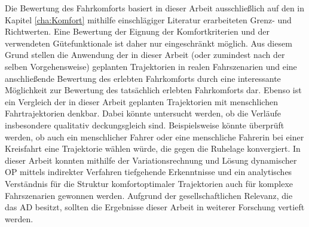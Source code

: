 Die Bewertung des Fahrkomforts basiert in dieser Arbeit ausschließlich auf den in Kapitel \ref{cha:Komfort} mithilfe einschlägiger Literatur erarbeiteten Grenz- und Richtwerten. Eine Bewertung der Eignung der Komfortkriterien und der verwendeten Gütefunktionale ist daher nur eingeschränkt möglich. Aus diesem Grund stellen die Anwendung der in dieser Arbeit (oder zumindest nach der selben Vorgehensweise) geplanten Trajektorien in realen Fahrszenarien und eine anschließende Bewertung des erlebten Fahrkomforts durch  eine interessante Möglichkeit zur Bewertung des tatsächlich erlebten Fahrkomforts dar. Ebenso ist ein Vergleich der in dieser Arbeit geplanten Trajektorien mit menschlichen Fahrtrajektorien denkbar. Dabei könnte untersucht werden, ob die Verläufe insbesondere qualitativ deckungsgleich sind. Beispielsweise könnte überprüft werden, ob auch ein menschlicher Fahrer oder eine menschliche Fahrerin bei einer Kreisfahrt eine Trajektorie wählen würde, die gegen die Ruhelage konvergiert. In dieser Arbeit konnten mithilfe der Variationsrechnung und Lösung dynamischer \gls{OP} mittels indirekter Verfahren tiefgehende Erkenntnisse und ein analytisches Verständnis für die Struktur komfortoptimaler Trajektorien auch für komplexe Fahrszenarien gewonnen werden. Aufgrund der gesellschaftlichen Relevanz, die das \gls{AD} besitzt, sollten die Ergebnisse dieser Arbeit in weiterer Forschung vertieft werden. 